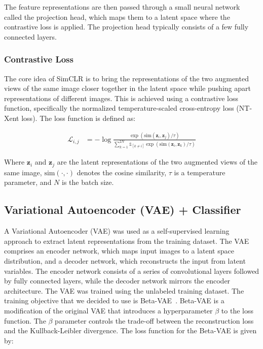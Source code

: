 \documentclass{article}
\begin{document}
The feature representations are then passed through a small neural network
called the projection head, which maps them to a latent space where the
contrastive loss is applied. The projection head typically consists of a few
fully connected layers.

\subsubsection{Contrastive Loss}
The core idea of SimCLR is to bring the representations of the two augmented
views of the same image closer together in the latent space while pushing apart
representations of different images. This is achieved using a contrastive loss
function, specifically the normalized temperature-scaled cross-entropy loss
(NT-Xent loss). The loss function is defined as:

\begin{align}
  \mathcal{L}_{i,j} & = -\log
  \frac{\exp(\text{sim}(\mathbf{z}_i, \mathbf{z}_j) / \tau)}{\sum_{k=1}^{2N}
  \mathbb{1}_{[k \neq i]} \exp(\text{sim}(\mathbf{z}_i, \mathbf{z}_k) / \tau)}
  \label{eq:simclr}
\end{align}

Where $\mathbf{z}_i$ and $\mathbf{z}_j$ are the latent representations of the
two augmented views of the same image, $\text{sim}(\cdot, \cdot)$ denotes the
cosine similarity, $\tau$ is a temperature parameter, and $N$ is the batch
size.

\subsection{Variational Autoencoder (VAE) + Classifier}

A Variational Autoencoder (VAE) was used as a self-supervised learning approach
to extract latent representations from the training dataset. The VAE comprises
an encoder network, which maps input images to a latent space distribution, and
a decoder network, which reconstructs the input from latent variables. The
encoder network consists of a series of convolutional layers followed by fully
connected layers, while the decoder network mirrors the encoder architecture.
The VAE was trained using the unlabeled training dataset. The training
objective that we decided to use is Beta-VAE~\cite{beta-vae}. Beta-VAE is a
modification of the original VAE that introduces a hyperparameter $\beta$ to
the loss function. The $\beta$ parameter controls the trade-off between the
reconstruction loss and the Kullback-Leibler divergence. The loss function for
the Beta-VAE is given by:
\end{document}
